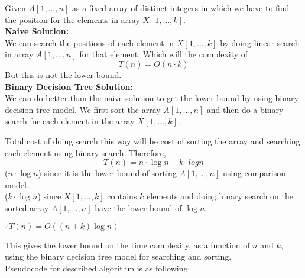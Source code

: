 \documentclass[a4paper,11pt]{article}
\theoremstyle{quest}
\newenvironment{solution}[2][Solution]{\begin{trivlist}
		\item[\hskip \labelsep {\bfseries #1}\hskip \labelsep {\bfseries #2.}]}{\end{trivlist}}
\begin{document}
\newpage
\begin{solution}2
	Given $A[1,\dots,n]$ as a fixed array of distinct integers in which we have to find the position for the elements in array $X[1,\dots,k]$.\\
	
	\textbf{Naive Solution:}\\
	
	We can search the positions of each element in $X[1,\dots,k]$ by doing linear search in array $A[1,\dots,n]$ for that element. Which will the complexity of
	\begin{equation*}
	T(n) = O(n\cdot k)
	\end{equation*}
	But this is not the lower bound. \\
	
	\textbf{Binary Decision Tree Solution:}\\
	
	We can do better than the naive solution to get the lower bound by using binary decision tree model. We first sort the array $A[1,\dots,n]$ and then do a binary search for each element in the array $X[1,\dots,k]$.
	
	Total cost of doing search this way will be cost of sorting the array and searching each element using binary search. Therefore,
	\begin{equation*}
	T(n) = n\cdot \log{n} + k \cdot log{n}
	\end{equation*}
	($n \cdot \log{n}$) since it is the lower bound of sorting $A[1,\dots,n]$ using comparison model.\\
	($k \cdot \log{n}$) since $X[1,\dots,k]$ contains $k$ elements and doing binary search on the sorted array $A[1,\dots,n]$ have the lower bound of $\log{n}$.
	\begin{center}
		$\therefore T(n) = O((n+k)\log{n})$ \\
	\end{center}
	This gives the lower bound on the time complexity, as a function of $n$ and $k$, using the binary decision tree model for searching and sorting.\\
	
	Pseudocode for described algorithm is as following: 
	\begin{algorithm}[h]
		\begin{algorithmic}
			 
			 
			 \\
			
			\\
			 \\
			 
			\EndFor\\
			\EndFunction
		\end{algorithmic}
	\end{algorithm}
\end{solution} 
\end{document}
